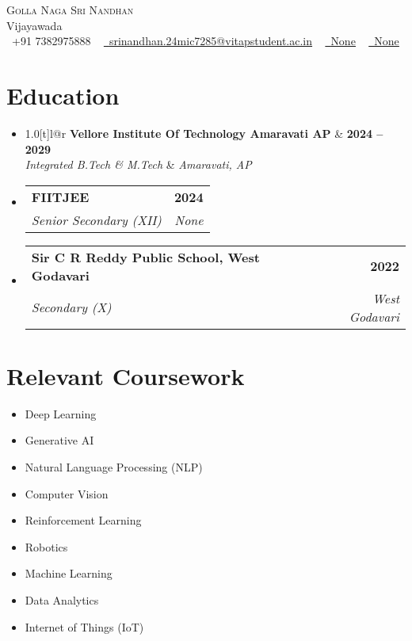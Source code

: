 \documentclass[letterpaper,11pt]{article}
\makeatletter
\newcommand{\resumeSubheading}[4]{
  \vspace{-2pt}\item
    \begin{tabular*}{1.0\textwidth}[t]{l@{\extracolsep{\fill}}r}
      \textbf{#1} & \textbf{\small #2} \\
      \textit{\small#3} & \textit{\small #4} \\
    \end{tabular*}\vspace{-7pt}
}
\newcommand{\resumeSubHeadingListStart}{\begin{itemize}[leftmargin=0.0in, label={}]}
\newcommand{\resumeSubHeadingListEnd}{\end{itemize}}
\makeatother
\begin{document}
\begin{center}
    {\Huge \scshape Golla Naga Sri Nandhan} \\ \vspace{1pt}
    Vijayawada \\ \vspace{1pt}
    \small \raisebox{-0.1\height}\faPhone\ +91 7382975888 ~ \href{mailto:srinandhan.24mic7285@vitapstudent.ac.in}{\raisebox{-0.2\height}\faEnvelope\  \underline{srinandhan.24mic7285@vitapstudent.ac.in}} ~ 
    \href{None}{\raisebox{-0.2\height}\faLinkedin\ \underline{None}}  ~
    \href{None}{\raisebox{-0.2\height}\faGithub\ \underline{None}}
    \vspace{-8pt}
\end{center}

\section{Education}
  \resumeSubHeadingListStart
    \resumeSubheading
      {Vellore Institute Of Technology Amaravati AP}{2024 -- 2029}
      {Integrated B.Tech & M.Tech}{Amaravati, AP}
    \resumeSubheading
      {FIITJEE}{2024}
      {Senior Secondary (XII)}{None}
    \resumeSubheading
      {Sir C R Reddy Public School, West Godavari}{2022}
      {Secondary (X)}{West Godavari}
  \resumeSubHeadingListEnd



\section{Relevant Coursework}
    \begin{multicols}{4}
        \begin{itemize}[itemsep=-5pt, parsep=3pt]
            \item\small Deep Learning
            \item\small Generative AI
            \item\small Natural Language Processing (NLP)
            \item\small Computer Vision
            \item\small Reinforcement Learning
            \item\small Robotics
            \item\small Machine Learning
            \item\small Data Analytics
            \item\small Internet of Things (IoT)
        \end{itemize}
    \end{multicols}
    \vspace*{2.0\multicolsep}
\end{document}
